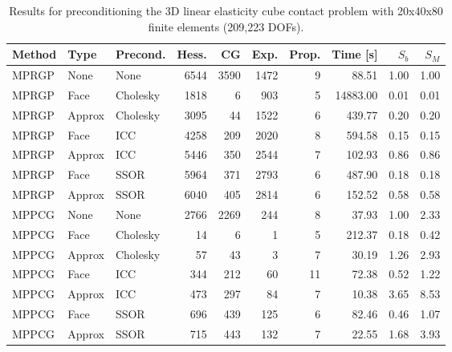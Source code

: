 \documentclass[11pt]{article}
\theoremstyle{plain}
\theoremstyle{definition}
\begin{document}
\begin{table}[htbp]
\centering
\begin{tabular}{l *{2}{|l} *{7}{|r}}
  Method & Type & Precond. & Hess. & CG & Exp. & Prop. & Time [s] & $S_b$ & $S_M$\\\hline
MPRGP & None & None & 6544 & 3590 & 1472 & 9 & 88.51 & 1.00 & 1.00\\ \hline
MPRGP & Face & Cholesky & 1818 & 6 & 903 & 5 & 14883.00 & 0.01 & 0.01\\
MPRGP & Approx & Cholesky & 3095 & 44 & 1522 & 6 & 439.77 & 0.20 & 0.20\\ \hline
MPRGP & Face & ICC & 4258 & 209 & 2020 & 8 & 594.58 & 0.15 & 0.15\\
MPRGP & Approx & ICC & 5446 & 350 & 2544 & 7 & 102.93 & 0.86 & 0.86\\ \hline
MPRGP & Face & SSOR & 5964 & 371 & 2793 & 6 & 487.90 & 0.18 & 0.18\\
MPRGP & Approx & SSOR & 6040 & 405 & 2814 & 6 & 152.52 & 0.58 & 0.58\\ \hline \hline

MPPCG & None & None & 2766 & 2269 & 244 & 8 & 37.93 & 1.00 & 2.33\\ \hline
MPPCG & Face & Cholesky & 14 & 6 & 1 & 5 & 212.37 & 0.18 & 0.42\\
MPPCG & Approx & Cholesky & 57 & 43 & 3 & 7 & 30.19 & 1.26 & 2.93\\ \hline
MPPCG & Face & ICC & 344 & 212 & 60 & 11 & 72.38 & 0.52 & 1.22\\
MPPCG & Approx & ICC & 473 & 297 & 84 & 7 & 10.38 & 3.65 & 8.53\\ \hline
MPPCG & Face & SSOR & 696 & 439 & 125 & 6 & 82.46 & 0.46 & 1.07\\
MPPCG & Approx & SSOR & 715 & 443 & 132 & 7 & 22.55 & 1.68 & 3.93\\
\end{tabular}
\caption[Preconditioned 3D contact problem II.]{Results for preconditioning the 3D linear elasticity cube contact problem with 20x40x80 finite elements (209,223 DOFs).}
\label{tab:precondCube2}
\end{table}
\end{document}
